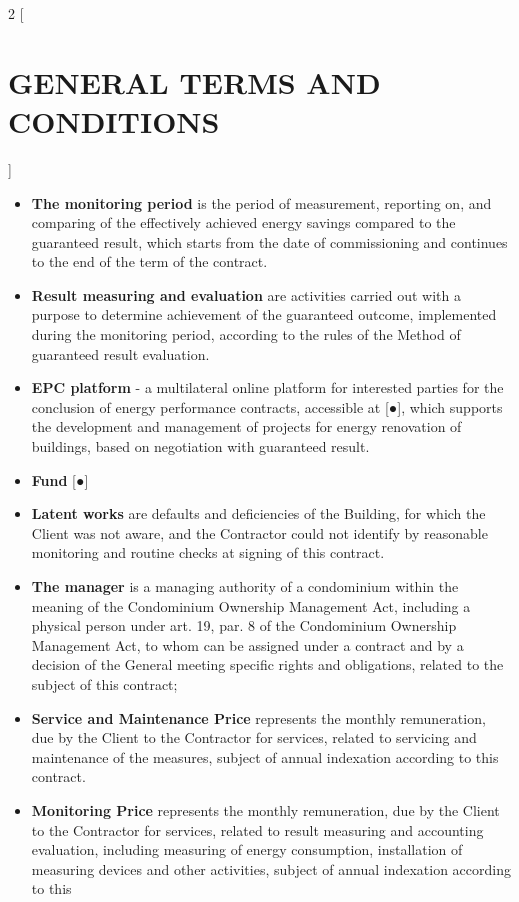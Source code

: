 \begin{multicols}{2} [\section{GENERAL TERMS AND CONDITIONS}]
\begin{itemize}[label={}]
    the Building is delivered by the Contractor to the Client shall be
    deemed the final document proving that the implemented works are
    duly completed under the conditions of this contract;
  \item\textbf{The monitoring period} is the period of measurement,
    reporting on, and comparing of the effectively achieved energy
    savings compared to the guaranteed result, which starts from the
    date of commissioning and continues to the end of the term of the
    contract.
  \item\textbf{Result measuring and evaluation} are activities carried
    out with a purpose to determine achievement of the guaranteed
    outcome, implemented during the monitoring period, according to
    the rules of the Method of guaranteed result evaluation.
  \item\textbf{EPC platform} {-} a multilateral online platform for
    interested parties for the conclusion of energy performance
    contracts, accessible at [●], which supports the development and
    management of projects for energy renovation of buildings, based
    on negotiation with guaranteed result.
  \item\textbf{Fund} [●]
  \item\textbf{Latent works} are defaults and deficiencies of the
    Building, for which the Client was not aware, and the Contractor
    could not identify by reasonable monitoring and routine checks at
    signing of this contract.
  \item\textbf{The manager} is a managing authority of a condominium
    within the meaning of the Condominium Ownership Management Act,
    including a physical person under art. 19, par. 8 of the
    Condominium Ownership Management Act, to whom can be assigned
    under a contract and by a decision of the General meeting specific
    rights and obligations, related to the subject of this contract;
  \item\textbf{Service and Maintenance Price} represents the monthly
    remuneration, due by the Client to the Contractor for services,
    related to servicing and maintenance of the measures, subject of
    annual indexation according to this contract.
  \item\textbf{Monitoring Price} represents the monthly remuneration,
    due by the Client to the Contractor for services, related to
    result measuring and accounting evaluation, including measuring of
    energy consumption, installation of measuring devices and other
    activities, subject of annual indexation according to this

\end{itemize}
\end{multicols}
